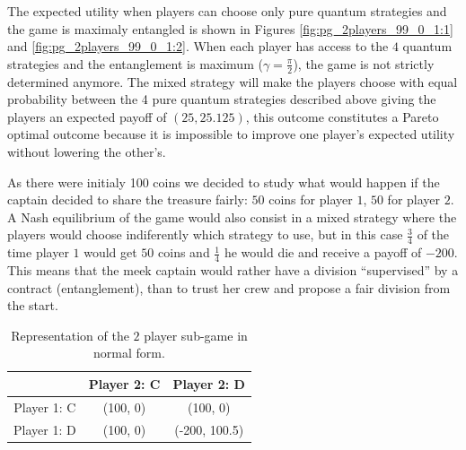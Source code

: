 The expected utility when players can choose only pure quantum strategies and the game is maximaly entangled is shown in Figures \ref{fig:pg_2players_99_0_1:1} and \ref{fig:pg_2players_99_0_1:2}. When each player has access to the $4$ quantum strategies and the entanglement is maximum ($\gamma=\frac{\pi}{2}$), the game is not strictly determined anymore. The mixed strategy will make the players choose with equal probability between the 4 pure quantum strategies described above giving the players an expected payoff of $(25, 25.125)$, this outcome constitutes a Pareto optimal outcome because it is impossible to improve one player's expected utility without lowering the other's. 

As there were initialy 100 coins we decided to study what would happen if the captain decided to share the treasure fairly: $50$ coins for player $1$, $50$ for player $2$. A Nash equilibrium of the game would also consist in a mixed strategy where the players would choose indiferently which strategy to use, but in this case $\frac{3}{4}$ of the time player $1$ would get $50$ coins and $\frac{1}{4}$ he would die and receive a payoff of $-200$. This means that the meek captain would rather have a division ``supervised'' by a contract (entanglement), than to trust her crew and propose a fair division from the start.

\begin{table}[h]
\begin{center}
\begin{centering}
\begin{tabular}{ccc}
\hline 
  & Player 2: C & Player 2: D\tabularnewline
\hline 
Player 1: C & (100, 0) & (100, 0)\tabularnewline
Player 1: D & (100, 0) & (-200, 100.5)\tabularnewline
\hline 
\end{tabular}

\par\end{centering}
\caption{Representation of the $2$ player sub-game in normal form.}
\label{tab:classico2jogadores_analise}
\end{center}
\end{table}

